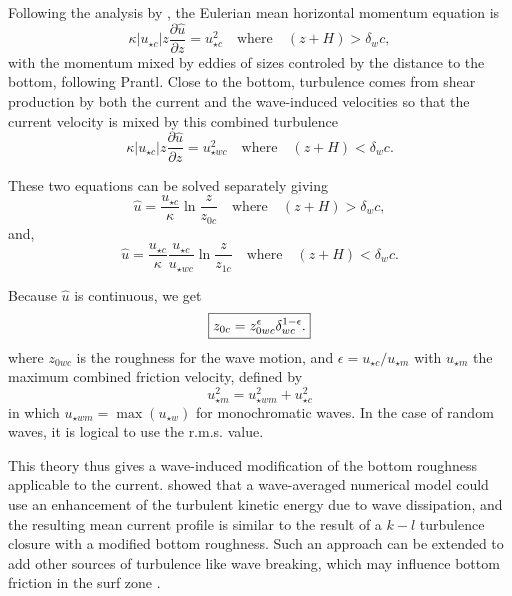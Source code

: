 Following the analysis by \cite{Grant&Madsen1979}, the Eulerian mean  horizontal momentum equation is 
\begin{equation}
\kappa \left|u_{\star c}\right| z \frac{\partial \widehat{u}}{\partial z} =
u_{\star c}^2  \quad \textrm{where} \quad \left(z+H\right) > \delta_wc,
\end{equation}
with the momentum mixed by eddies of sizes controled by the distance to the bottom, following  Prantl. 
Close to the bottom, turbulence comes from shear production by both the current and the wave-induced velocities so that 
the current velocity is mixed by this combined turbulence 
\begin{equation}
\kappa \left|u_{\star c}\right| z \frac{\partial \widehat{u}}{\partial z} =
u_{\star wc}^2  \quad \textrm{where} \quad \left(z+H\right) < \delta_wc.
\label{curr_wbbl}
\end{equation}


These two equations can be solved separately giving 
\begin{equation}
\widehat{u} =\frac{u_{\star c}}{\kappa} \ln \frac{z}{z_{0c}} 
\quad \textrm{where} \quad \left(z+H\right) > \delta_wc,
\end{equation}
and,
\begin{equation}
\widehat{u} =\frac{u_{\star c}}{\kappa} \frac{u_{\star c}}{u_{\star wc}} \ln
\frac{z}{z_{1c}}  \quad \textrm{where} \quad \left(z+H\right) <
\delta_wc.
\end{equation}

Because $\widehat{u}$ is continuous, we get 
\begin{equation}
\fbox{$\displaystyle z_{0c} = z_{0wc}^\epsilon \delta_{wc}^{1-\epsilon}.$}\label{z0c}
\end{equation}
where $z_{0wc}$ is the roughness for the wave motion, and $\epsilon=u_{\star c}/u_{\star
m}$ with $u_{\star m}$ the maximum combined friction velocity, defined by 
\begin{equation}
u_{\star m}^2 = u_{\star w m}^2 + u_{\star c}^2
\end{equation}
in which  $u_{\star w m}=\max(u_{\star w})$ for monochromatic waves. In the case of random waves, it is logical to use the  r.m.s. value. 

This theory thus gives a wave-induced modification of the bottom roughness applicable to the current. \cite{Mellor2002} showed that a wave-averaged numerical model could use an enhancement of the turbulent kinetic energy due to wave dissipation, and the resulting mean current profile is similar to the result of a $k-l$ turbulence closure with a modified bottom roughness. Such an approach can be extended to add other sources of turbulence like wave breaking, which may influence bottom friction in the surf zone 
 \citep{Feddersen&al.2003} .


